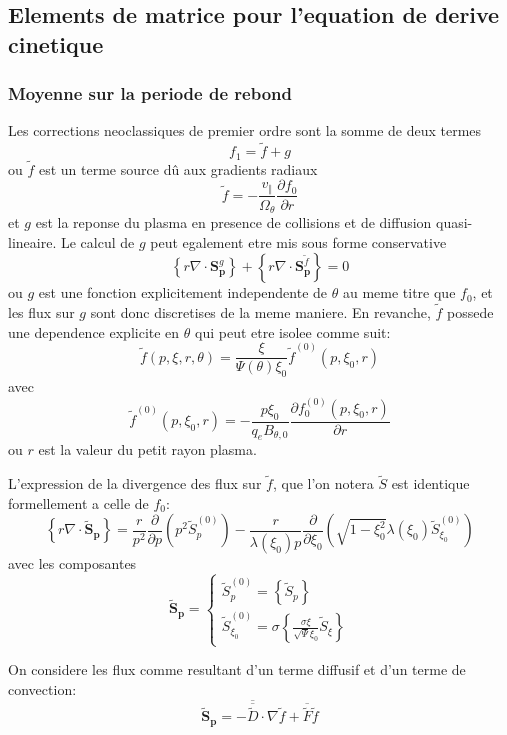 
\subsection{Elements de matrice pour l'equation de derive cinetique}


\subsubsection{Moyenne sur la periode de rebond}

Les corrections neoclassiques de premier ordre sont la somme de deux
termes \[
f_{1}=\widetilde{f}+g\]
 ou $\widetilde{f}$ est un terme source d\^{u} aux gradients radiaux
\[
\widetilde{f}=-\frac{v_{\Vert}}{\Omega_{\theta}}\frac{\partial f_{0}}{\partial r}\]
 et $g$ est la reponse du plasma en presence de collisions et de
diffusion quasi-lineaire. Le calcul de $g$ peut egalement etre mis
sous forme conservative \[
\left\{ r\nabla\cdot\mathbf{S}_{\mathbf{p}}^{g}\right\} +\left\{ r\nabla\cdot\mathbf{S}_{\mathbf{p}}^{\widetilde{f}}\right\} =0\]
 ou $g$ est une fonction explicitement independente de $\theta$
au meme titre que $f_{0}$, et les flux sur $g$ sont donc discretises
de la meme maniere. En revanche, $\widetilde{f}$ possede une dependence
explicite en $\theta$ qui peut etre isolee comme suit: \[
\widetilde{f}(p,\xi,r,\theta)=\frac{\xi}{\Psi(\theta)\xi_{0}}\widetilde{f}^{(0)}(p,\xi_{0},r)\]
 avec \[
\widetilde{f}^{(0)}(p,\xi_{0},r)=-\frac{p\xi_{0}}{q_{e}B_{\theta,0}}\frac{\partial f_{0}^{(0)}(p,\xi_{0},r)}{\partial r}\]
 ou $r$ est la valeur du petit rayon plasma.

L'expression de la divergence des flux sur $\widetilde{f}$, que l'on
notera $\widetilde{S}$ est identique formellement a celle de $f_{0}:$\[
\left\{ r\nabla\cdot\widetilde{\mathbf{S}}_{\mathbf{p}}\right\} =\frac{r}{p^{2}}\frac{\partial}{\partial p}(p^{2}\widetilde{S}_{p}^{(0)})-\frac{r}{\lambda\left(\xi_{0}\right)p}\frac{\partial}{\partial\xi_{0}}\left(\sqrt{1-\xi_{0}^{2}}\lambda\left(\xi_{0}\right)\widetilde{S}_{\xi_{0}}^{(0)}\right)\]
 avec les composantes \[
\widetilde{\mathbf{S}}_{\mathbf{p}}=\left\{ \begin{array}{l}
\widetilde{S}_{p}^{(0)}=\left\{ \widetilde{S}_{p}\right\} \\
\widetilde{S}_{\xi_{0}}^{(0)}=\sigma\left\{ \frac{\sigma\xi}{\sqrt{\Psi}\xi_{0}}\widetilde{S}_{\xi}\right\} \end{array}\right.\]


On considere les flux comme resultant d'un terme diffusif et d'un
terme de convection: \[
\widetilde{\mathbf{S}}_{\mathbf{p}}=-\overline{\overline{\widetilde{D}}}\cdot\nabla\widetilde{f}+\overline{\widetilde{F}}\widetilde{f}\]


